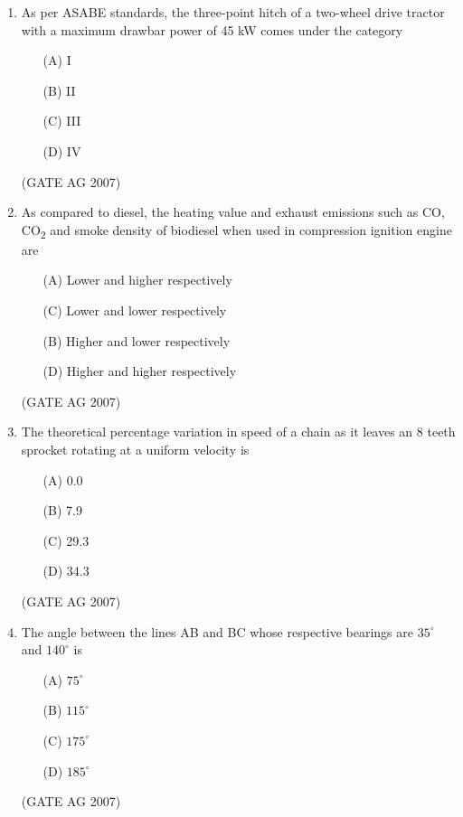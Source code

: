 \documentclass[journal,12pt,onecolumn]{IEEEtran}
\theoremstyle{remark}
\begin{document}
\begin{enumerate}[label=Q\arabic*:]
\item  As per ASABE standards, the three-point hitch of a two-wheel drive tractor with a maximum drawbar power of 45 kW comes under the category
\begin{multicols}{4}
\begin{enumerate}
    \item[(A)] I
    \item[(B)] II
    \item[(C)] III
    \item[(D)] IV
\end{enumerate}
\end{multicols}
\hfill(GATE AG 2007)


\item  As compared to diesel, the heating value and exhaust emissions such as CO, CO\textsubscript{2} and smoke density of biodiesel when used in compression ignition engine are
\begin{multicols}{2}
\begin{enumerate}
    \item[(A)] Lower and higher respectively
    \item[(C)] Lower and lower respectively
    \item[(B)] Higher and lower respectively
    \item[(D)] Higher and higher respectively
\end{enumerate}
\end{multicols}
\hfill(GATE AG 2007)

\item 
The theoretical percentage variation in speed of a chain as it leaves an 8 teeth sprocket rotating at  a uniform velocity is
\begin{multicols}{4}
\begin{enumerate}
    \item[(A)] 0.0
    \item[(B)] 7.9
    \item[(C)] 29.3
    \item[(D)] 34.3
\end{enumerate}
\end{multicols}
\hfill(GATE AG 2007)


\item  The angle between the lines AB and BC whose respective bearings are $35^\circ$ and $140^\circ$ is
\begin{multicols}{4}
\begin{enumerate}
    \item[(A)] $75^\circ$
    \item[(B)] $115^\circ$
    \item[(C)] $175^\circ$
    \item[(D)] $185^\circ$
\end{enumerate}
\end{multicols}
\hfill(GATE AG 2007)



\end{enumerate}
\end{document}
